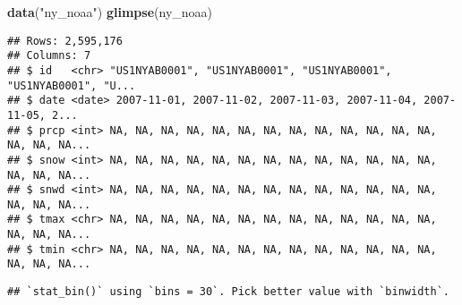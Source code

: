 \documentclass[]{article}
\newenvironment{Shaded}{\begin{snugshade}}{\end{snugshade}}
\newcommand{\DataTypeTok}[1]{\textcolor[rgb]{0.13,0.29,0.53}{#1}}
\newcommand{\KeywordTok}[1]{\textcolor[rgb]{0.13,0.29,0.53}{\textbf{#1}}}
\newcommand{\NormalTok}[1]{#1}
\newcommand{\OperatorTok}[1]{\textcolor[rgb]{0.81,0.36,0.00}{\textbf{#1}}}
\newcommand{\StringTok}[1]{\textcolor[rgb]{0.31,0.60,0.02}{#1}}
\begin{document}
\begin{Shaded}
\begin{Highlighting}[]
\KeywordTok{data}\NormalTok{(}\StringTok{"ny_noaa"}\NormalTok{)}
\KeywordTok{glimpse}\NormalTok{(ny_noaa)}
\end{Highlighting}
\end{Shaded}

\begin{verbatim}
## Rows: 2,595,176
## Columns: 7
## $ id   <chr> "US1NYAB0001", "US1NYAB0001", "US1NYAB0001", "US1NYAB0001", "U...
## $ date <date> 2007-11-01, 2007-11-02, 2007-11-03, 2007-11-04, 2007-11-05, 2...
## $ prcp <int> NA, NA, NA, NA, NA, NA, NA, NA, NA, NA, NA, NA, NA, NA, NA, NA...
## $ snow <int> NA, NA, NA, NA, NA, NA, NA, NA, NA, NA, NA, NA, NA, NA, NA, NA...
## $ snwd <int> NA, NA, NA, NA, NA, NA, NA, NA, NA, NA, NA, NA, NA, NA, NA, NA...
## $ tmax <chr> NA, NA, NA, NA, NA, NA, NA, NA, NA, NA, NA, NA, NA, NA, NA, NA...
## $ tmin <chr> NA, NA, NA, NA, NA, NA, NA, NA, NA, NA, NA, NA, NA, NA, NA, NA...
\end{verbatim}

\begin{Shaded}
\end{Shaded}

\begin{verbatim}
## `stat_bin()` using `bins = 30`. Pick better value with `binwidth`.
\end{verbatim}
\end{document}
